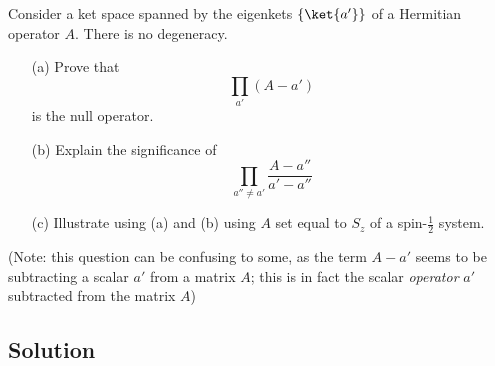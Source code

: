 Consider a ket space spanned by the eigenkets $\{\ket{a'}\}$ of a
Hermitian operator $A$.  There is no degeneracy.
\begin{itemize}
\item[(a)] Prove that
  \[\prod_{a'}(A - a')\]
  is the null operator.
\item[(b)] Explain the significance of
  \[\prod_{a''\neq a'}\frac{A - a''}{a' - a''}\]
\item[(c)] Illustrate using (a) and (b) using $A$ set equal to $S_z$
  of a spin-$\frac{1}{2}$ system.
\end{itemize}

(Note: this question can be confusing to some, as the term $A - a'$
seems to be subtracting a scalar $a'$ from a matrix $A$; this is in
fact the scalar \emph{operator} $a'$ subtracted from the matrix $A$)
\subsection*{Solution}

